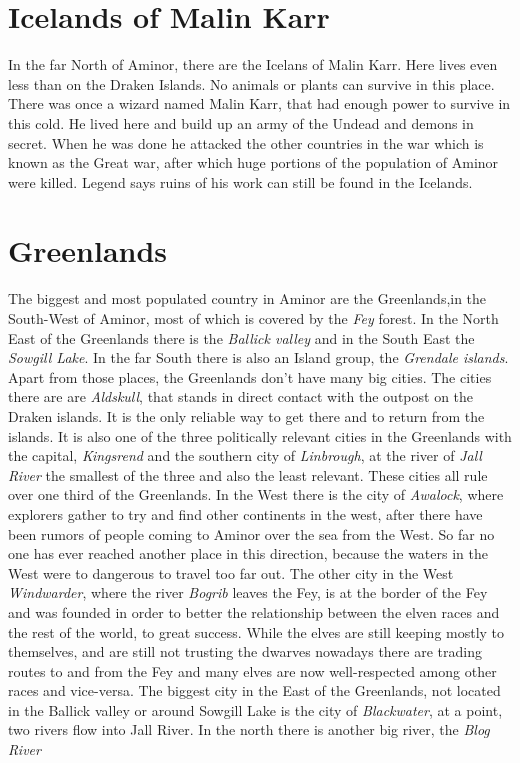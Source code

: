 \documentclass[oneside]{book}
\begin{document}
	\chapter{Icelands of Malin Karr}
	In the far North of Aminor, there are the Icelans of Malin Karr. Here lives even less than on the Draken Islands. No animals or plants can survive in this place. 
	There was once a wizard named Malin Karr, that had enough power to survive in this cold. He lived here and build up an army of the Undead and demons in secret.
	When he was done he attacked the other countries in the war which is known as the Great war, after which huge portions of the population of Aminor were killed.
	Legend says ruins of his work can still be found in the Icelands.
	
	\chapter{Greenlands}
	The biggest and most populated country in Aminor are the Greenlands,in the South-West of Aminor, most of which is covered by the \textit{Fey} forest.
	In the North East of the Greenlands there is the \textit{Ballick valley} and in the South East the \textit{Sowgill Lake}.
	In the far South there is also an Island group, the \textit{Grendale islands}. Apart from those places, the Greenlands don't have many big cities.
	The cities there are are \textit{Aldskull}, that stands in direct contact with the outpost on the Draken islands. It is the only reliable way to get there and to return from the islands.
	It is also one of the three politically relevant cities in the Greenlands with the capital, \textit{Kingsrend} and the southern city of \textit{Linbrough}, at the river of \textit{Jall River}
	the smallest of the three and also the least relevant.
	These cities all rule over one third of the Greenlands.
	In the West there is the city of \textit{Awalock}, where explorers gather to try and find other continents in the west, after there have been rumors of people coming to Aminor over the sea from the West. 
	So far no one has ever reached another place in this direction, because the waters in the West were to dangerous to travel too far out.
	The other city in the West \textit{Windwarder}, where the river \textit{Bogrib} leaves the Fey, is at the border of the Fey and was founded in order to better the relationship
	between the elven races and the rest of the world, to great success.
	While the elves are still keeping mostly to themselves, and are still not trusting the dwarves nowadays there are trading routes to and from the Fey and many elves are now well-respected among other races and vice-versa.
	The biggest city in the East of the Greenlands, not located in the Ballick valley or around Sowgill Lake is the city of \textit{Blackwater}, at a point, two rivers flow into Jall River.
	In the north there is another big river, the \textit{Blog River}
	
\end{document}
